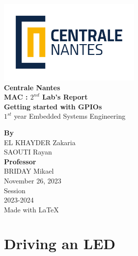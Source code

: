 \documentclass{article}
\begin{document}
\makeatletter
\begin{titlepage}
\begin{center}
    
\includegraphics[width=7cm]{assets/LogoCN_Q.png}
\\
\textbf{\large{Centrale Nantes}}
\\[2cm]

\textbf{\large{MAC : $2^{nd}$ Lab's Report \\
Getting started with GPIOs}}
\\[14pt]
$1^{st}$ year Embedded Systems Engineering
\\[2cm]


\vfill

\textbf{By} \\
EL KHAYDER Zakaria \\
SAOUTI Rayan
\\[1cm]

\textbf{Professor} \\
BRIDAY Mikael
\\[3cm]


November 26, 2023 \\ [12pt]

Session \\
2023-2024 \\[12pt]
\small{Made with \LaTeX}
\end{center}
\end{titlepage}
\makeatother

\pagebreak

\setcounter{page}{1}

\clearpage
{}
\tableofcontents

\clearpage
{}
\listoftables
{}
\lstlistoflistings

\clearpage

\setcounter{page}{1}

\section{Driving an LED}
\end{document}
